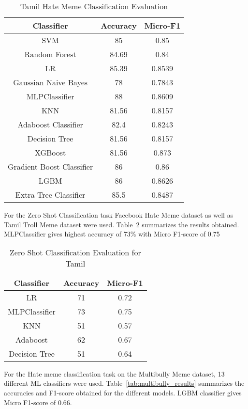 \documentclass{ieeeaccess}
\begin{document}
\begin{table}[htbp]
\caption{Tamil Hate Meme Classification Evaluation}
\label{tab:tamil_results}
\centering
\begin{tabular}{|c|c|c|}
\hline
\textbf{Classifier} & \textbf{Accuracy} & \textbf{Micro-F1} \\
\hline
SVM & 85 & 0.85 \\
Random Forest & 84.69 & 0.84 \\
LR & 85.39 & 0.8539 \\
Gaussian Naive Bayes & 78 & 0.7843 \\
MLPClassifier & 88 & 0.8609 \\
KNN & 81.56 & 0.8157 \\
Adaboost Classifier & 82.4 & 0.8243 \\
Decision Tree & 81.56 & 0.8157 \\
XGBoost & 81.56 & 0.873 \\
Gradient Boost Classifier & 86 & 0.86 \\
LGBM & 86 & 0.8626 \\
Extra Tree Classifier & 85.5 & 0.8487 \\
\hline
\end{tabular}
\end{table}

For the Zero Shot Classification task Facebook Hate Meme dataset as well as Tamil Troll Meme dataset were used. Table~\ref{tab:zero_shot_tamil} summarizes the results obtained. MLPClassifier gives highest accuracy of 73\% with Micro F1-score of 0.75

\begin{table}[htbp]
\caption{Zero Shot Classification Evaluation for Tamil}
\label{tab:zero_shot_tamil}
\centering
\begin{tabular}{|c|c|c|}
\hline
\textbf{Classifier} & \textbf{Accuracy} & \textbf{Micro-F1} \\
\hline
LR & 71 & 0.72 \\
MLPClassifier & 73 & 0.75 \\
KNN & 51 & 0.57 \\
Adaboost & 62 & 0.67 \\
Decision Tree & 51 & 0.64 \\
\hline
\end{tabular}
\end{table}

For the Hate meme classification task on the Multibully Meme dataset, 13 different ML classifiers were used. Table~\ref{tab:multibully_results} summarizes the accuracies and F1-score obtained for the different models. LGBM classifier gives Micro F1-score of 0.66.
\end{document}
